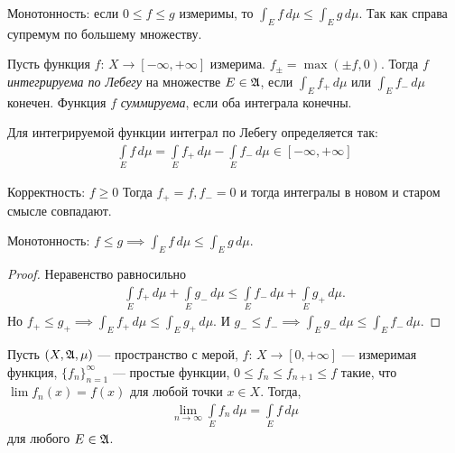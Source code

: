 \begin{remrk}
 Монотонность: если $0 \leqslant f \leqslant g$ измеримы, то $\int_E f \, d\mu \leqslant 
 \int_E g\,d\mu$. Так как справа супремум по большему множеству.
\end{remrk}
\begin{df}
 Пусть функция $f \colon\, X \to [-\infty,+\infty] $ измерима. $f_{\pm} = \max(\pm f, 0)$. Тогда $f$ \textit{интегрируема по Лебегу} на множестве $E \in \mathfrak{A}$, если $\int_E f_+ \, d\mu$  или $\int_E f_- \, d\mu$ конечен. Функция $f$ \textit{суммируема}, если оба интеграла конечны.

 Для интегрируемой функции интеграл по Лебегу определяется так: \begin{align*}
  \int\limits_E f \, d\mu = \int\limits_E f_+ \, d\mu - \int\limits_E f_- \, d\mu \in [-\infty,+\infty]
 \end{align*} 
\end{df}
\begin{remrk}
 Корректность: $f \geqslant 0$ Тогда $f_+= f, f_- = 0$ и тогда интегралы в новом и старом смысле совпадают.
\end{remrk}
\begin{remrk}
 Монотонность: $f \leqslant g \implies \int_E f \, d\mu \leqslant \int_E g \, d\mu$.
\end{remrk}
\begin{proof}
 Неравенство равносильно \begin{align*}
  \int\limits_E f_+ \, d\mu + \int\limits_E g_- \, d\mu \leqslant \int\limits_E f_- \, d\mu + \int\limits_E g_+ \, d\mu
 .\end{align*} Но $f_+ \leqslant g_+ \implies \int_E f_+ \, d\mu \leqslant \int_E g_+ \, d\mu$. И $g_- \leqslant f_- \implies \int_E g_- \, d\mu \leqslant \int_E f_- \, d\mu$.
\end{proof}
\begin{thm}
 \label{theorem:levi}
 Пусть $(X, \mathfrak{A}, \mu)$ --- пространство с мерой, $f \colon\, X \to [0, +\infty] $ --- измеримая функция, $\{f_{n}\}_{n=1}^{\infty} $ --- простые функции, $0 \leqslant f_n \leqslant f_{n+1} \leqslant f$ такие, что $\lim f_n(x) = f(x)$ для любой точки  $x \in X$. Тогда, \begin{align*}
  \lim\limits_{n \to \infty} \int\limits_E f_n \, d\mu = \int\limits_E f \, d\mu
 \end{align*} для любого $E \in \mathfrak{A}$.
\end{thm}
